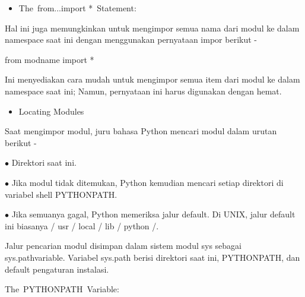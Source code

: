 \vspace{\baselineskip}
\begin{itemize}
	\item The from...import * Statement:
\end{itemize}

\noindent Hal ini juga memungkinkan untuk mengimpor semua nama dari modul ke dalam namespace saat ini dengan menggunakan pernyataan impor berikut -\par


\vspace{\baselineskip}
\noindent from modname import *\par


\vspace{\baselineskip}
\noindent Ini menyediakan cara mudah untuk mengimpor semua item dari modul ke dalam namespace saat ini; Namun, pernyataan ini harus digunakan dengan hemat.\par


\vspace{\baselineskip}
\begin{itemize}
	\item Locating Modules
\end{itemize}

\noindent Saat mengimpor modul, juru bahasa Python mencari modul dalam urutan berikut -\par

\vspace{\baselineskip}
$\bullet$  Direktori saat ini.\par

\vspace{\baselineskip}
$\bullet$  Jika modul tidak ditemukan, Python kemudian mencari setiap direktori di variabel shell PYTHONPATH.\par

\vspace{\baselineskip}
$\bullet$  Jika semuanya gagal, Python memeriksa jalur default. Di UNIX, jalur default ini biasanya / usr / local / lib / python /.\par


\vspace{\baselineskip}
\noindent Jalur pencarian modul disimpan dalam sistem modul sys sebagai sys.pathvariable. Variabel sys.path berisi direktori saat ini, PYTHONPATH, dan default pengaturan instalasi.\par

\vspace{\baselineskip}
\vspace{\baselineskip}
\noindent The PYTHONPATH Variable:\par

